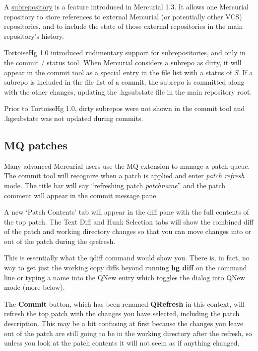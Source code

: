 \documentclass[letterpaper,10pt,english]{manual}
\begin{document}
A \href{http://mercurial.selenic.com/wiki/subrepos}{subrepository}
is a feature introduced in Mercurial 1.3.  It allows one Mercurial
repository to store references to external Mercurial (or potentially
other VCS) repositories, and to include the state of those external
repositories in the main repository's history.

TortoiseHg 1.0 introduced rudimentary support for subrepositories, and
only in the commit / status tool.  When Mercurial considers a subrepo as
dirty, it will appear in the commit tool as a special entry in the file
list with a status of \emph{S}.  If a subrepo is included in the file list of
a commit, the subrepo is committed along with the other changes,
updating the .hgsubstate file in the main repository root.

Prior to TortoiseHg 1.0, dirty subrepos were not shown in the commit
tool and .hgsubstate was not updated during commits.


\subsection{MQ patches}

Many advanced Mercurial users use the MQ extension to manage a patch
queue.  The commit tool will recognize when a patch is applied and enter
\emph{patch refresh} mode. The title bar will say ``refreshing patch
\emph{patchname}'' and the patch comment will appear in the commit message
pane.

A new `Patch Contents' tab will appear in the diff pane with the full
contents of the top patch.  The Text Diff and Hunk Selection tabs will
show the combined diff of the patch and working directory changes so
that you can move changes into or out of the patch during the qrefresh.

This is essentially what the qdiff command would show you.  There is, in
fact, no way to get just the working copy diffs beyond running
\textbf{hg diff} on the command line or typing a name into the QNew
entry which toggles the dialog into QNew mode (more below).

The \textbf{Commit} button, which has been renamed \textbf{QRefresh}
in this context, will refresh the top patch with the changes you
have selected, including the patch description. This may be a bit
confusing at first because the changes you leave out of the patch are
still going to be in the working directory after the refresh, so unless
you look at the patch contents it will not seem as if anything changed.
\end{document}
